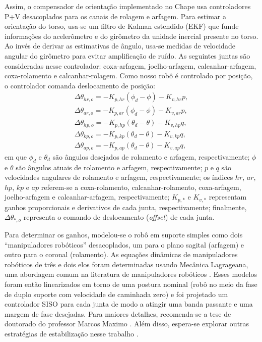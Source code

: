 Assim, o compensador de orientação implementado no Chape usa controladores P+V desacoplados para os canais de rolagem e arfagem. Para estimar a orientação do torso, usa-se um filtro de Kalman estendido (EKF) que funde informações do acelerômetro e do girômetro da unidade inercial presente no torso. Ao invés de derivar as estimativas de ângulo, usa-se medidas de velocidade angular do girômetro para evitar amplificação de ruído. As seguintes juntas são consideradas nesse controlador: coxa-arfagem, joelho-arfagem, calcanhar-arfagem, coxa-rolamento e calcanhar-rolagem. Como nosso robô é controlado por posição, o controlador comanda deslocamento de posição:
\begin{align}
\Delta \theta_{hr,o} = -K_{p,hr} \left( \phi_d - \phi \right) - K_{v,hr} p, \\
\Delta \theta_{ar,o} = -K_{p,ar} \left( \phi_d - \phi \right) - K_{v,ar} p, \\
\Delta \theta_{hp,o} = -K_{p,hp} \left( \theta_d - \theta \right) - K_{v,hp} q, \\
\Delta \theta_{kp,o} = -K_{p,kp} \left( \theta_d - \theta \right) - K_{v,kp} q, \\
\Delta \theta_{ap,o} = -K_{p,ap} \left( \theta_d - \theta \right) - K_{v,ap} q,
\end{align}
em que \( \phi_d \) e \( \theta_d \) são ângulos desejados de rolamento e arfagem, respectivamente; \( \phi \) e \( \theta \) são ângulos atuais de rolamento e arfagem, respectivamente; \( p \) e \( q \) são velocidades angulares de rolamento e arfagem, respectivamente; os índices \( hr \), \( ar \), \( hp \), \( kp \) e \( ap \) referem-se a coxa-rolamento, calcanhar-rolamento, coxa-arfagem, joelho-arfagem e calcanhar-arfagem, respectivamente; \( K_{p,*} \) e \( K_{v,*} \) representam ganhos proporcionais e derivativos de cada junta, respectivamente; finalmente, \( \Delta \theta_{*,o} \) representa o comando de deslocamento (\emph{offset}) de cada junta.

Para determinar os ganhos, modelou-se o robô em suporte simples como dois ``manipuladores robóticos'' desacoplados, um para o plano sagital (arfagem) e outro para o coronal (rolamento). As equações dinâmicas de manipuladores robóticos de três e dois elos foram determinadas usando Mecânica Lagrageana, uma abordagem comum na literatura de manipuladores robóticos \cite{craig1986}. Esses modelos foram então linearizados em torno de uma postura nominal (robô no meio da fase de duplo suporte com velocidade de caminhada zero) e foi projetado um controlador SISO para cada junta de modo a atingir uma banda passante e uma margem de fase desejadas. Para maiores detalhes, recomenda-se a tese de doutorado do professor Marcos Maximo \cite{tesemarcos}. Além disso, espera-se explorar outras estratégias de estabilização nesse trabalho \cite{takenaka2009,takenaka2009b,naveau2017,kajita2014}.

